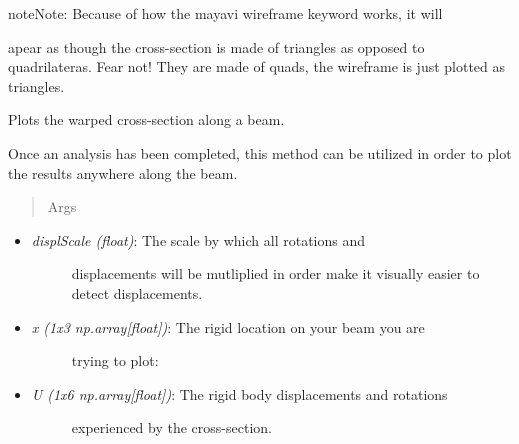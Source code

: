 \documentclass[letterpaper,10pt,english]{sphinxmanual}
\begin{document}
\begin{fulllineitems}
\begin{fulllineitems}
\begin{itemize}
\end{itemize}

\begin{notice}{note}{Note:}
Because of how the mayavi wireframe keyword works, it will
\end{notice}

apear as though the cross-section is made of triangles as opposed to
quadrilateras. Fear not! They are made of quads, the wireframe is just
plotted as triangles.

\end{fulllineitems}


\begin{fulllineitems}
\label{structures:AeroComBAT.Structures.XSect.plotWarped}
Plots the warped cross-section along a beam.

Once an analysis has been completed, this method can be utilized in
order to plot the results anywhere along the beam.
\begin{quote}\begin{description}
\item[{Args}] \leavevmode
\end{description}\end{quote}
\begin{itemize}
\item {} \begin{description}
\item[{\emph{displScale (float)}: The scale by which all rotations and}] \leavevmode
displacements will be mutliplied in order make it visually
easier to detect displacements.

\end{description}

\item {} \begin{description}
\item[{\emph{x (1x3 np.array{[}float{]})}: The rigid location on your beam you are}] \leavevmode
trying to plot:

\end{description}

\item {} \begin{description}
\item[{\emph{U (1x6 np.array{[}float{]})}: The rigid body displacements and rotations}] \leavevmode
experienced by the cross-section.


\end{description}
\end{itemize}
\end{fulllineitems}
\end{fulllineitems}
\end{document}
